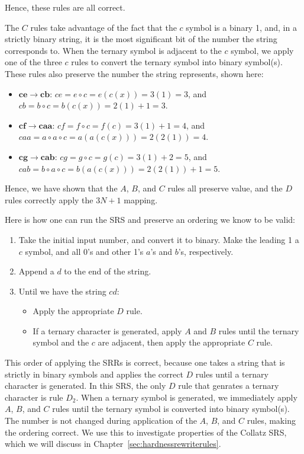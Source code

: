 Hence, these rules are all correct. \par
The $C$ rules take advantage of the fact that the $c$ symbol is a binary 1, and, in a strictly binary string, it is the most significant bit of the number the string corresponds to. When the ternary symbol is adjacent to the $c$ symbol, we apply one of the three $c$ rules to convert the ternary symbol into binary symbol(s). These rules also preserve the number the string represents, shown here:
\begin{itemize}
    \item $\boldsymbol{ce \rightarrow cb}$: $ce = e \circ c = e(c(x)) = 3(1) = 3$, and $cb = b
    \circ c = b(c(x)) = 2(1)+1 = 3$.
    \item $\boldsymbol{cf \rightarrow caa}$: $cf = f \circ c = f(c) = 3(1)+ 1 = 4$, and $caa = a \circ a \circ c = a(a(c(x))) = 2(2(1)) = 4$.
    \item $\boldsymbol{cg \rightarrow cab}$: $cg = g \circ c = g(c) = 3(1)+ 2 = 5$, and $cab = b \circ a \circ c = b(a(c(x))) = 2(2(1))+1 = 5$.
\end{itemize}
Hence, we have shown that the $A$, $B$, and $C$ rules all preserve value, and the $D$ rules correctly apply the $3N+1$ mapping. \par
Here is how one can run the SRS and preserve an ordering we know to be valid:
\begin{enumerate}
    \item Take the initial input number, and convert it to binary. Make the leading 1 a $c$ symbol, and all 0's and other 1's $a$'s and $b$'s, respectively.
    \item Append a $d$ to the end of the string.
    \item Until we have the string $cd$: 
    \begin{itemize}
        \item Apply the appropriate $D$ rule.
        \item If a ternary character is generated, apply $A$ and $B$ rules until the ternary symbol and the $c$ are adjacent, then apply the appropriate $C$ rule.
    \end{itemize}
\end{enumerate}
This order of applying the SRRs is correct, because one takes a string that is strictly in binary symbols and applies the correct $D$ rules until a ternary character is generated. In this SRS, the only $D$ rule that genrates a ternary character is rule $D_2$. When a ternary symbol is generated, we immediately apply $A$, $B$, and $C$ rules until the ternary symbol is converted into binary symbol(s). The number is not changed during application of the $A$, $B$, and $C$ rules, making the ordering correct. We use this to investigate properties of the Collatz SRS, which we will discuss in Chapter~\ref{sec:hardnessrewriterules}. \par
